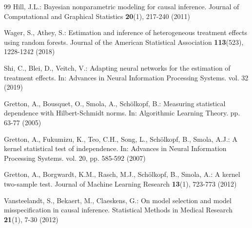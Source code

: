 \documentclass{svproc}
\begin{document}
\begin{thebibliography}{99}
Hill, J.L.: Bayesian nonparametric modeling for causal inference. Journal of Computational and Graphical Statistics \textbf{20}(1), 217-240 (2011)

Wager, S., Athey, S.: Estimation and inference of heterogeneous treatment effects using random forests. Journal of the American Statistical Association \textbf{113}(523), 1228-1242 (2018)

Shi, C., Blei, D., Veitch, V.: Adapting neural networks for the estimation of treatment effects. In: Advances in Neural Information Processing Systems. vol. 32 (2019)

Gretton, A., Bousquet, O., Smola, A., Sch\"{o}lkopf, B.: Measuring statistical dependence with Hilbert-Schmidt norms. In: Algorithmic Learning Theory. pp. 63-77 (2005)

Gretton, A., Fukumizu, K., Teo, C.H., Song, L., Sch\"{o}lkopf, B., Smola, A.J.: A kernel statistical test of independence. In: Advances in Neural Information Processing Systems. vol. 20, pp. 585-592 (2007)

Gretton, A., Borgwardt, K.M., Rasch, M.J., Sch\"{o}lkopf, B., Smola, A.: A kernel two-sample test. Journal of Machine Learning Research \textbf{13}(1), 723-773 (2012)

Vansteelandt, S., Bekaert, M., Claeskens, G.: On model selection and model misspecification in causal inference. Statistical Methods in Medical Research \textbf{21}(1), 7-30 (2012)

\end{thebibliography}
\end{document}
